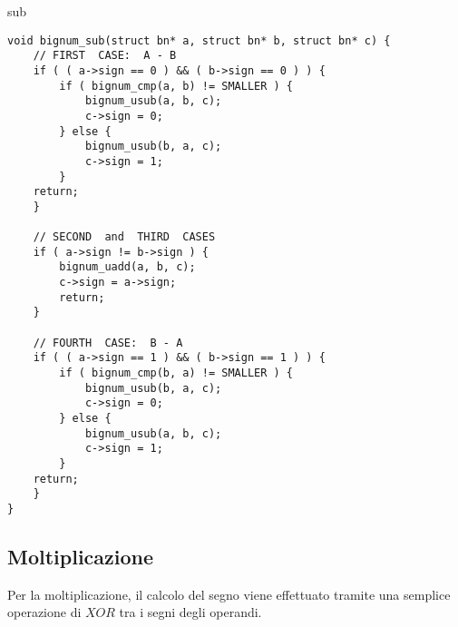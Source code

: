 \begin{algorithm}[H]
	\caption{sub}
	\label{alg:sub}
	\DontPrintSemicolon
\end{algorithm}

\begin{lstlisting}[basicstyle=\ttfamily\small, backgroundcolor=\color{bgCode}]
void bignum_sub(struct bn* a, struct bn* b, struct bn* c) {
    // FIRST  CASE:  A - B
    if ( ( a->sign == 0 ) && ( b->sign == 0 ) ) {
        if ( bignum_cmp(a, b) != SMALLER ) {
            bignum_usub(a, b, c);
            c->sign = 0;
        } else {
            bignum_usub(b, a, c);
            c->sign = 1;
        }
    return;
    }
    
    // SECOND  and  THIRD  CASES
    if ( a->sign != b->sign ) {
        bignum_uadd(a, b, c);
        c->sign = a->sign;
        return;
    }
    
    // FOURTH  CASE:  B - A
    if ( ( a->sign == 1 ) && ( b->sign == 1 ) ) {
        if ( bignum_cmp(b, a) != SMALLER ) {
            bignum_usub(b, a, c);
            c->sign = 0;
        } else {
            bignum_usub(a, b, c);
            c->sign = 1;
        }
    return;
    }
}
\end{lstlisting}


%
\subsection{Moltiplicazione}
%

Per la moltiplicazione, il calcolo del segno viene effettuato tramite una semplice operazione di $XOR$ tra i segni degli operandi.

